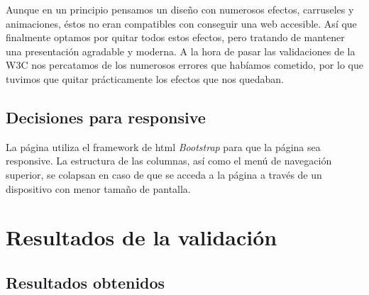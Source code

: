 Aunque en un principio pensamos un diseño con numerosos efectos, carruseles y animaciones, éstos no eran compatibles con conseguir una web accesible. Así que finalmente optamos por quitar todos estos efectos, pero tratando de mantener una presentación agradable y moderna.
A la hora de pasar las validaciones de la W3C nos percatamos de los numerosos errores que habíamos cometido, por lo que tuvimos que quitar prácticamente los efectos que nos quedaban.

\subsection{Decisiones para responsive}
La página utiliza el framework de html \textit{Bootstrap} para que la página sea responsive. La estructura de las columnas, así como el menú de navegación superior, se colapsan en caso de que se acceda a la página a través de un dispositivo con menor tamaño de pantalla.
\section{Resultados de la validación}
\subsection{Resultados obtenidos}

